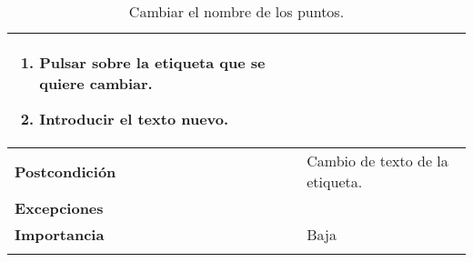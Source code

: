 \begin{longtable}[H]{@{}l|l@{}}
\begin{minipage}[t]{0.71\columnwidth}
\begin{enumerate}
			\def\labelenumi{\arabic{enumi}.}
			\tightlist
			\item Pulsar sobre la etiqueta que se quiere cambiar.
			\item Introducir el texto nuevo. 
		\end{enumerate}
	\end{minipage}\tabularnewline
	\midrule
	\begin{minipage}[t]{0.23\columnwidth}\raggedright\strut
		\textbf{Postcondición}\strut
	\end{minipage} & \begin{minipage}[t]{0.71\columnwidth}\raggedright\strut
		Cambio de texto de la etiqueta.
	\end{minipage}\tabularnewline
	\midrule
	\begin{minipage}[t]{0.23\columnwidth}\raggedright\strut
		\textbf{Excepciones}\strut
	\end{minipage} & \begin{minipage}[t]{0.71\columnwidth}\raggedright
		
	\end{minipage}\tabularnewline
	\midrule
	\begin{minipage}[t]{0.23\columnwidth}\raggedright\strut
		\textbf{Importancia}\strut
	\end{minipage} & \begin{minipage}[t]{0.71\columnwidth}\raggedright\strut
		Baja\strut
	\end{minipage}\tabularnewline
	\bottomrule
	\caption{Cambiar el nombre de los puntos.}
	\label{cu:3.3}
\end{longtable}
\newpage

